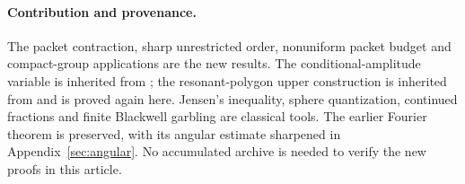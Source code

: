 \paragraph{Contribution and provenance.}
The packet contraction, sharp unrestricted order, nonuniform packet
budget and compact-group applications are the new results. The
conditional-amplitude variable is inherited from \cite{GTF34}; the
resonant-polygon upper construction is inherited from \cite{GTF33} and
is proved again here. Jensen's inequality, sphere quantization,
continued fractions and finite Blackwell garbling are classical tools.
The earlier Fourier theorem is preserved, with its angular estimate
sharpened in Appendix~\ref{sec:angular}. No accumulated archive is needed
to verify the new proofs in this article.
